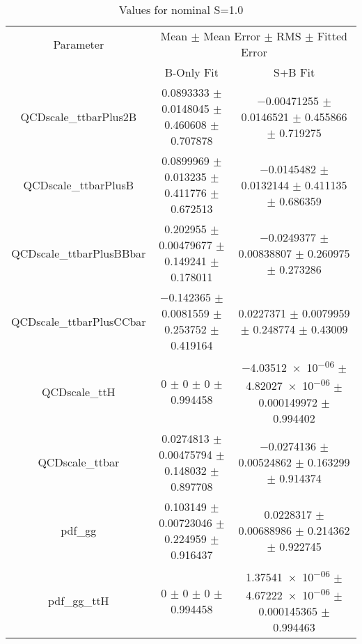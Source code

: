 \begin{table}
\centering
\caption{Values for nominal S=1.0}
\begin{tabular}{ccc}
\toprule
Parameter & \multicolumn{2}{c}{Mean $\pm$ Mean Error $\pm$ RMS $\pm$ Fitted Error}\\
 & B-Only Fit & S+B Fit\\
\midrule
QCDscale\_ttbarPlus2B & \num{0.0893333} $\pm$ \num{0.0148045} $\pm$ \num{0.460608} $\pm$ \num{0.707878} & \num{-0.00471255} $\pm$ \num{0.0146521} $\pm$ \num{0.455866} $\pm$ \num{0.719275}\\
QCDscale\_ttbarPlusB & \num{0.0899969} $\pm$ \num{0.013235} $\pm$ \num{0.411776} $\pm$ \num{0.672513} & \num{-0.0145482} $\pm$ \num{0.0132144} $\pm$ \num{0.411135} $\pm$ \num{0.686359}\\
QCDscale\_ttbarPlusBBbar & \num{0.202955} $\pm$ \num{0.00479677} $\pm$ \num{0.149241} $\pm$ \num{0.178011} & \num{-0.0249377} $\pm$ \num{0.00838807} $\pm$ \num{0.260975} $\pm$ \num{0.273286}\\
QCDscale\_ttbarPlusCCbar & \num{-0.142365} $\pm$ \num{0.0081559} $\pm$ \num{0.253752} $\pm$ \num{0.419164} & \num{0.0227371} $\pm$ \num{0.0079959} $\pm$ \num{0.248774} $\pm$ \num{0.43009}\\
QCDscale\_ttH & \num{0} $\pm$ \num{0} $\pm$ \num{0} $\pm$ \num{0.994458} & \num{-4.03512e-06} $\pm$ \num{4.82027e-06} $\pm$ \num{0.000149972} $\pm$ \num{0.994402}\\
QCDscale\_ttbar & \num{0.0274813} $\pm$ \num{0.00475794} $\pm$ \num{0.148032} $\pm$ \num{0.897708} & \num{-0.0274136} $\pm$ \num{0.00524862} $\pm$ \num{0.163299} $\pm$ \num{0.914374}\\
pdf\_gg & \num{0.103149} $\pm$ \num{0.00723046} $\pm$ \num{0.224959} $\pm$ \num{0.916437} & \num{0.0228317} $\pm$ \num{0.00688986} $\pm$ \num{0.214362} $\pm$ \num{0.922745}\\
pdf\_gg\_ttH & \num{0} $\pm$ \num{0} $\pm$ \num{0} $\pm$ \num{0.994458} & \num{1.37541e-06} $\pm$ \num{4.67222e-06} $\pm$ \num{0.000145365} $\pm$ \num{0.994463}\\
\bottomrule
\end{tabular}
\end{table}